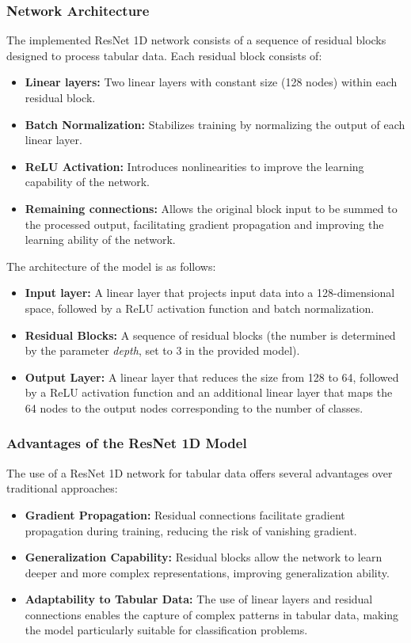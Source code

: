 \documentclass[a4paper,final,12pt]{report}
\begin{document}
\subsubsection{Network Architecture}
The implemented ResNet 1D network consists of a sequence of residual blocks designed to process tabular data. Each residual block consists of:
\begin{itemize}
    \item \textbf{Linear layers:} Two linear layers with constant size (128 nodes) within each residual block.
    \item \textbf{Batch Normalization:} Stabilizes training by normalizing the output of each linear layer.
    \item \textbf{ReLU Activation:} Introduces nonlinearities to improve the learning capability of the network.
    \item \textbf{Remaining connections:} Allows the original block input to be summed to the processed output, facilitating gradient propagation and improving the learning ability of the network.
\end{itemize}

The architecture of the model is as follows:
\begin{itemize}
    \item \textbf{Input layer:} A linear layer that projects input data into a 128-dimensional space, followed by a ReLU activation function and batch normalization.
    \item \textbf{Residual Blocks:} A sequence of residual blocks (the number is determined by the parameter \textit{depth}, set to 3 in the provided model).
    \item \textbf{Output Layer:} A linear layer that reduces the size from 128 to 64, followed by a ReLU activation function and an additional linear layer that maps the 64 nodes to the output nodes corresponding to the number of classes.
\end{itemize}

\subsubsection{Advantages of the ResNet 1D Model}
The use of a ResNet 1D network for tabular data offers several advantages over traditional approaches:
\begin{itemize}
    \item \textbf{Gradient Propagation:} Residual connections facilitate gradient propagation during training, reducing the risk of vanishing gradient.
    \item \textbf{Generalization Capability:} Residual blocks allow the network to learn deeper and more complex representations, improving generalization ability.
    \item \textbf{Adaptability to Tabular Data:} The use of linear layers and residual connections enables the capture of complex patterns in tabular data, making the model particularly suitable for classification problems.
\end{itemize}
\end{document}
